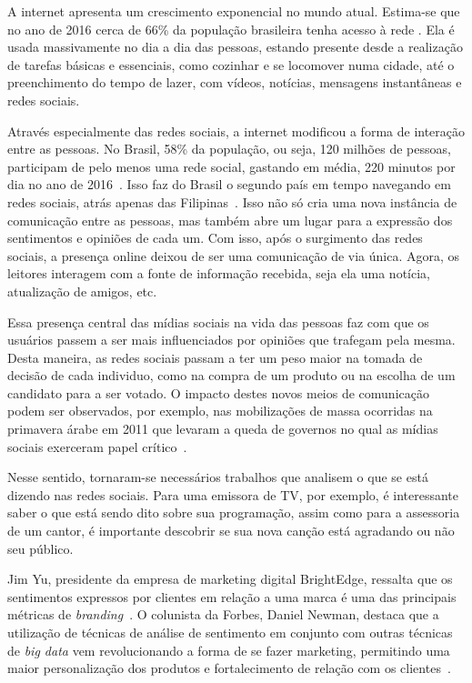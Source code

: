
A internet apresenta um crescimento exponencial no mundo atual.
Estima-se que no ano de 2016 cerca de 66\% da população brasileira tenha acesso à rede \cite{social17}.
Ela é usada massivamente no dia a dia das pessoas, estando presente desde a realização de tarefas básicas e essenciais,
como cozinhar e se locomover numa cidade, até o preenchimento do tempo de lazer, com vídeos, notícias, mensagens
instantâneas e redes sociais.

Através especialmente das redes sociais, a internet modificou a forma de interação entre as pessoas.
No Brasil, 58\% da população, ou seja, 120 milhões de pessoas, participam de pelo menos uma rede social, gastando em
média, 220 minutos por dia no ano de 2016~\cite{social17}.
Isso faz do Brasil o segundo país em tempo navegando em redes sociais, atrás apenas das Filipinas~\cite{social17}.
Isso não só cria uma nova instância de comunicação entre as pessoas, mas também abre um lugar para a expressão dos
sentimentos e opiniões de cada um.
Com isso, após o surgimento das redes sociais, a presença online deixou de ser uma comunicação de via única.
Agora, os leitores interagem com a fonte de informação recebida, seja ela uma notícia, atualização de amigos, etc.

Essa presença central das mídias sociais na vida das pessoas faz com que os usuários passem a ser mais influenciados
por opiniões que trafegam pela mesma.
Desta maneira, as redes sociais passam a ter um peso maior na tomada de decisão de cada individuo, como na compra de
um produto ou na escolha de um candidato para a ser votado.
O impacto destes novos meios de comunicação podem ser observados, por exemplo, nas mobilizações de massa ocorridas na
primavera árabe em 2011 que levaram a queda de governos no qual as mídias sociais exerceram papel
crítico~\cite{mourtada11}.

Nesse sentido, tornaram-se necessários trabalhos que analisem o que se está dizendo nas redes sociais.
Para uma emissora de TV, por exemplo, é interessante saber o que está sendo dito sobre sua programação, assim como para
a assessoria de um cantor, é importante descobrir se sua nova canção está agradando ou não seu público.

Jim Yu, presidente da empresa de marketing digital BrightEdge, ressalta que os sentimentos expressos por clientes em
relação a uma marca é uma das principais métricas de \textit{branding}~\cite{marketingland}.
O colunista da Forbes, Daniel Newman, destaca que a utilização de técnicas de análise de sentimento em conjunto com
outras técnicas de \textit{big data} vem revolucionando a forma de se fazer marketing, permitindo uma maior
personalização dos produtos e fortalecimento de relação com os clientes~\cite{newman16}.

